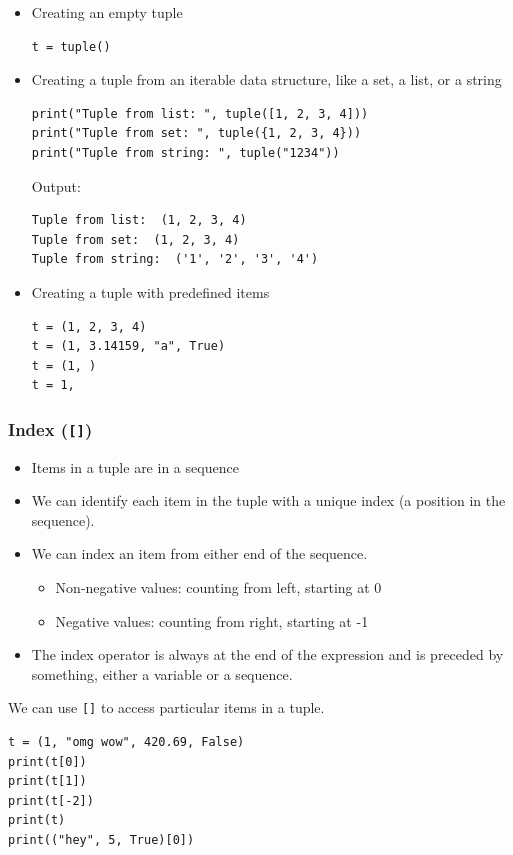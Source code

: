 \documentclass[11pt]{article}
\begin{document}
\begin{itemize}
\item Creating an empty tuple
\begin{verbatim}
t = tuple()
\end{verbatim}

\item Creating a tuple from an iterable data structure, like a set, a list, or a string

\begin{verbatim}
print("Tuple from list: ", tuple([1, 2, 3, 4]))
print("Tuple from set: ", tuple({1, 2, 3, 4}))
print("Tuple from string: ", tuple("1234"))
\end{verbatim}

 \noindent Output:

\begin{verbatim}
Tuple from list:  (1, 2, 3, 4)
Tuple from set:  (1, 2, 3, 4)
Tuple from string:  ('1', '2', '3', '4')
\end{verbatim}

\item Creating a tuple with predefined items
\begin{verbatim}
t = (1, 2, 3, 4)
t = (1, 3.14159, "a", True)
t = (1, )
t = 1,
\end{verbatim}
\end{itemize}

\subsubsection{Index (\texttt{[]})}
\label{sec:org76f9443}
\begin{itemize}
\item Items in a tuple are in a sequence
\item We can identify each item in the tuple with a unique index (a position in the sequence).
\item We can index an item from either end of the sequence.
\begin{itemize}
\item Non-negative values: counting from left, starting at 0
\item Negative values: counting from right, starting at -1
\end{itemize}
\item The index operator is always at the end of the expression and is preceded by something, either a variable or a sequence.
\end{itemize}

We can use \texttt{[]} to access particular items in a tuple.
\begin{verbatim}
t = (1, "omg wow", 420.69, False)
print(t[0])
print(t[1])
print(t[-2])
print(t)
print(("hey", 5, True)[0])
\end{verbatim}
\end{document}
